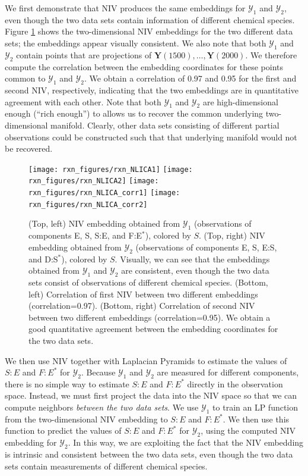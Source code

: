 \documentclass[aip,jcp,preprint]{revtex4-1}
\begin{document}
We first demonstrate that NIV produces the same embeddings for $\mathcal{Y}_1$ and $\mathcal{Y}_2$, even though the two data sets contain information of different chemical species.
%
Figure \ref{fig:rxn_embedding} shows the two-dimensional NIV embeddings for the two different data sets; the embeddings appear visually consistent.
%
We also note that both $\mathcal{Y}_1$ and $\mathcal{Y}_2$ contain points that are projections of $\mathbf{Y}(1500), \dots, \mathbf{Y}(2000)$.
%
We therefore compute the correlation between the embedding coordinates for these points common to $\mathcal{Y}_1$ and $\mathcal{Y}_2$.
%
We obtain a correlation of 0.97 and 0.95 for the first and second NIV, respectively, indicating that the two embeddings are in quantitative
agreement with each other.
%
Note that both $\mathcal{Y}_1$ and $\mathcal{Y}_2$ are high-dimensional enough (``rich enough'') to allows us to recover
the common underlying two-dimensional manifold.
%
Clearly, other data sets consisting of different partial observations could be constructed such that that underlying manifold would not be recovered.
%
%
\begin{figure}[ht]
    \texttt{[image: rxn\_figures/rxn\_NLICA1]}
    \texttt{[image: rxn\_figures/rxn\_NLICA2]}
    \texttt{[image: rxn\_figures/rxn\_NLICA\_corr1]}
    \texttt{[image: rxn\_figures/rxn\_NLICA\_corr2]}
    \caption{(Top, left) NIV embedding obtained from $\mathcal{Y}_1$ (observations of components E, S, S:E, and F:E$^{*}$), colored by $S$. (Top, right) NIV embedding obtained from $\mathcal{Y}_2$ (observations of components E, S, E:S, and D:S$^{*}$), colored by $S$. Visually, we can see that the embeddings obtained from $\mathcal{Y}_1$ and $\mathcal{Y}_2$ are consistent, even though the two data sets consist of observations of different chemical species. (Bottom, left) Correlation of first NIV between two different embeddings (correlation=0.97). (Bottom, right)  Correlation of second NIV between two different embeddings (correlation=0.95). We obtain a good quantitative agreement between the embedding coordinates for the two data sets.}
    \label{fig:rxn_embedding}
\end{figure}

We then use NIV together with Laplacian Pyramids to estimate the values of $S:E$ and $F:E^{*}$ for $\mathcal{Y}_2$.
%
Because $\mathcal{Y}_1$ and $\mathcal{Y}_2$ are measured for different components, there is no simple way to estimate $S:E$ and $F:E^{*}$ directly in the observation space.
%
Instead, we must first project the data into the NIV space so that we can compute neighbors {\em between the two data sets}.
%
We use $\mathcal{Y}_1$ to train an LP function from the two-dimensional NIV embedding to $S:E$ and $F:E^{*}$.
%
We then use this function to predict the values  of $S:E$ and $F:E^{*}$ for $\mathcal{Y}_2$, using the computed NIV embedding for $\mathcal{Y}_2$.
%
In this way, we are exploiting the fact that the NIV embedding is intrinsic and consistent between the two data sets, even though the two data sets contain measurements of different chemical species.
\end{document}
